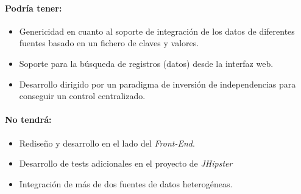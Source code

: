 \paragraph*{Podría tener:} 
\begin{itemize}
\item Genericidad en cuanto al soporte de integración de los datos de diferentes fuentes basado en un fichero de claves y valores. 
\item Soporte para la búsqueda de registros (datos) desde la interfaz web. 
\item Desarrollo dirigido por un paradigma de inversión de independencias para conseguir un control centralizado.
\end{itemize}

\paragraph*{No tendrá:} 
\begin{itemize}
\item Rediseño y desarrollo en el lado del \textit{Front-End}.
\item Desarrollo de tests adicionales en el proyecto de \textit{JHipster}
\item Integración de más de dos fuentes de datos heterogéneas. 
\end{itemize}




